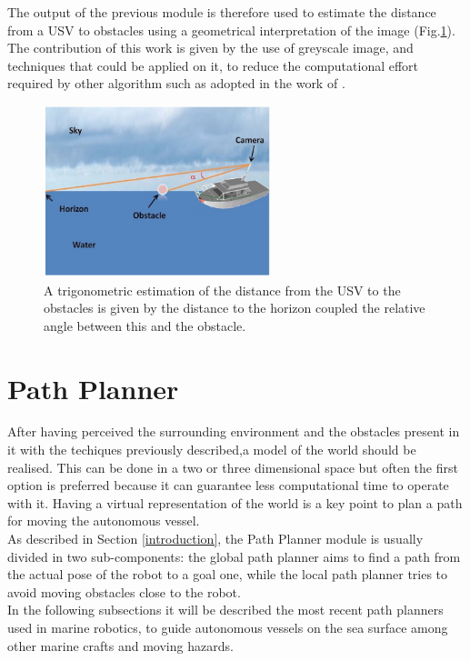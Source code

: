 \documentclass[12pt]{article}
\begin{document}
      \indent The output of the previous module is therefore used to estimate the distance from a USV to obstacles using a geometrical interpretation of the image (Fig.\ref{fig:geometric}).\\
      The contribution of this work is given by the use of greyscale image, and techniques that could be applied on it, to reduce the computational effort required by other algorithm such as \parencite{Ettinger2003} adopted in the work of \textcite{Larson2007a}.

      \begin{figure}
            \centering
            \includegraphics[height=5cm]{./Images/Azzabi/geometric}
            \caption{A trigonometric estimation of the distance from the USV to the obstacles is given by the distance to the horizon coupled the relative angle between this and the obstacle. }
            \label{fig:geometric}
      \end{figure}

\section{Path Planner} \label{path_planner}

      After having perceived the surrounding environment and the obstacles present in it with the techiques previously described,a model of the world should be realised. This can be done in a two or three dimensional space but often the first option is preferred because it can guarantee less computational time to operate with it. Having a virtual representation of the world is a key point to plan a path for moving the autonomous vessel.\\
      As described in Section \ref{introduction},  the Path Planner module is usually divided in two sub-components: the global path planner aims to find a path from the actual pose of the robot to a goal one, while the local path planner tries to avoid moving obstacles close to the robot.\\
      \indent In the following subsections it will be described the most recent path planners used in marine robotics, to guide autonomous vessels on the sea surface among other marine crafts and moving hazards.
\end{document}
